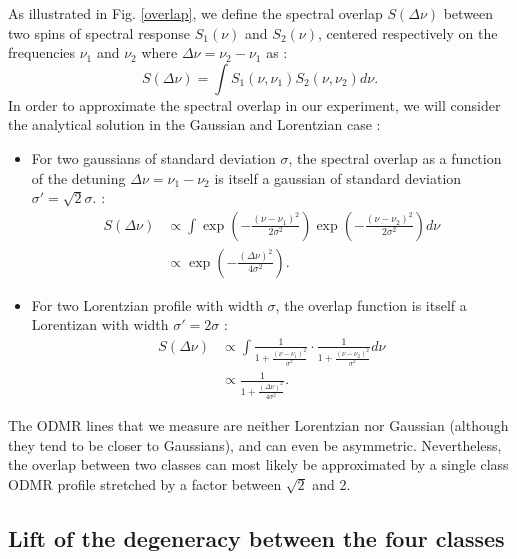 \documentclass[preprintnumbers,amsmath,amssymb,onecolumn,12pt]{revtex4-2}\usepackage{graphicx}%
\begin{document}
As illustrated in Fig. \ref{overlap}, we define the spectral overlap $S(\Delta \nu)$ between two spins of spectral response $S_1(\nu)$ and $S_2(\nu)$, centered respectively on the frequencies $\nu_1$ and $\nu_2$ where $\Delta \nu = \nu_2-\nu_1$ as :
\begin{equation}
S(\Delta \nu)=\int S_1(\nu, \nu_1)S_2(\nu, \nu_2) d\nu.
\end{equation}
In order to approximate the spectral overlap in our experiment, we will consider the analytical solution in the Gaussian and Lorentzian case :

\begin{itemize}
\item For two gaussians of standard deviation $\sigma$, the spectral overlap as a function of the detuning $\Delta \nu = \nu_1-\nu_2$ is itself a gaussian of standard deviation $\sigma'=\sqrt{2} \sigma$. :
\begin{align*}
S(\Delta \nu)&\propto \int \exp(-\frac{(\nu-\nu_1)^2}{2\sigma^2})\exp(-\frac{(\nu-\nu_2)^2}{2\sigma^2}) d\nu \\
&\propto\exp(-\frac{(\Delta \nu)^2}{4\sigma^2}).
\end{align*}

\item For two Lorentzian profile with width $\sigma$, the overlap function is itself a Lorentizan with width $\sigma'=2\sigma$ :
\begin{align*}
S(\Delta \nu)&\propto \int \frac{1}{1+ \frac{(\nu-\nu_1)^2}{\sigma^2}}\cdot \frac{1}{1+ \frac{(\nu-\nu_2)^2}{\sigma^2}} d\nu \\
&\propto\frac{1}{1+ \frac{(\Delta \nu)^2}{4\sigma^2}}.
\end{align*}
\end{itemize}

The ODMR lines that we measure are neither Lorentzian nor Gaussian (although they tend to be closer to Gaussians), and can even be asymmetric. Nevertheless, the overlap between two classes can most likely be approximated by a single class ODMR profile stretched by a factor between $\sqrt{2}$ and 2.

\subsection{Lift of the degeneracy between the four classes}
\end{document}
